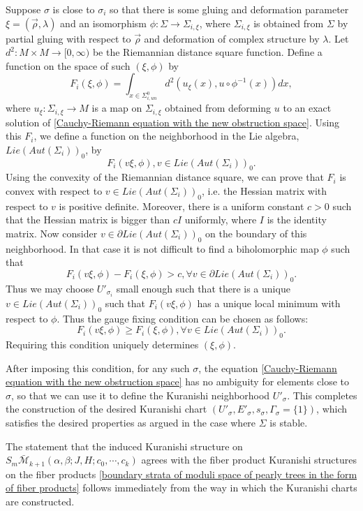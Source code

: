 \documentclass{amsart}
\numberwithin{equation}{section}
\numberwithin{figure}{section}
\begin{document}
	Suppose $\sigma$ is close to $\sigma_{i}$ so that there is some gluing and deformation parameter $\xi = (\vec{\rho}, \lambda)$ and an isomorphism $\phi: \Sigma \to \Sigma_{i, \xi}$, where $\Sigma_{i, \xi}$ is obtained from $\Sigma$ by partial gluing with respect to $\vec{\rho}$ and deformation of complex structure by $\lambda$. Let $d^{2}: M \times M \to [0, \infty)$ be the Riemannian distance square function. Define a function on the space of such $(\xi, \phi)$ by
\begin{equation}
F_{i}(\xi, \phi) = \int_{x \in \Sigma_{i, un}^{0}} d^{2}(u_{\xi}(x), u \circ \phi^{-1}(x))dx,
\end{equation}
where $u_{\xi}: \Sigma_{i, \xi} \to M$ is a map on $\Sigma_{i, \xi}$ obtained from deforming $u$ to an exact solution of \eqref{Cauchy-Riemann equation with the new obstruction space}. Using this $F_{i}$, we define a function on the neighborhood in the Lie algebra, $Lie(Aut(\Sigma_{i}))_{0}$, by
\begin{equation}
F_{i}(v \xi, \phi), v \in Lie(Aut(\Sigma_{i}))_{0}.
\end{equation}
Using the convexity of the Riemannian distance square, we can prove that $F_{i}$ is convex with respect to $v \in Lie(Aut(\Sigma_{i}))_{0}$, i.e. the Hessian matrix with respect to $v$ is positive definite. Moreover, there is a uniform constant $c > 0$ such that the Hessian matrix is bigger than $cI$ uniformly, where $I$ is the identity matrix. Now consider $v \in \partial Lie(Aut(\Sigma_{i}))_{0}$ on the boundary of this neighborhood. In that case it is not difficult to find a biholomorphic map $\phi$ such that
\begin{equation}
F_{i}(v \xi, \phi) - F_{i}(\xi, \phi) > c, \forall v \in \partial Lie(Aut(\Sigma_{i}))_{0}.
\end{equation}
Thus we may choose $U'_{\sigma_{i}}$ small enough such that there is a unique $v \in Lie(Aut(\Sigma_{i}))_{0}$ such that $F_{i}(v \xi, \phi)$ has a unique local minimum with respect to $\phi$. Thus the gauge fixing condition can be chosen as follows:
\begin{equation}
F_{i}(v \xi, \phi) \ge F_{i}(\xi, \phi), \forall v \in Lie(Aut(\Sigma_{i}))_{0}.
\end{equation}
Requiring this condition uniquely determines $(\xi, \phi)$. \par
	After imposing this condition, for any such $\sigma$, the equation \eqref{Cauchy-Riemann equation with the new obstruction space} has no ambiguity for elements close to $\sigma$, so that we can use it to define the Kuranishi neighborhood $U'_{\sigma}$. This completes the construction of the desired Kuranishi chart $(U'_{\sigma}, E'_{\sigma}, s_{\sigma}, \Gamma_{\sigma} = \{1\})$, which satisfies the desired properties as argued in the case where $\Sigma$ is stable. \par
	The statement that the induced Kuranishi structure on $S_{m}\bar{\mathcal{M}}_{k+1}(\alpha, \beta; J, H; c_{0}, \cdots, c_{k})$ agrees with the fiber product Kuranishi structures on the fiber products \eqref{boundary strata of moduli space of pearly trees in the form of fiber products} follows immediately from the way in which the Kuranishi charts are constructed. \par
\end{document}
